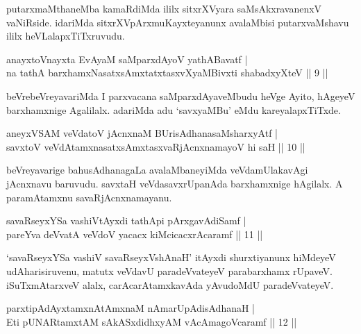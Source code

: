 \begin{artha}
putarxmaMthaneMba kamaRdiMda ililx sitxrXVyara saMsAkxravanenxV
vaNiRside. idariMda sitxrXVpArxmuKayxteyanunx avalaMbisi 
putarxvaMshavu ililx heVLalapxTiTxruvudu.
\end{artha}


\begin{shl}
anayxtoV\s nayxta EvAyaM saMparxdAyoV yathA\s Bavatf | \\
na tathA barxhamxNasatxsAmxtatxtasxvXyaMBivxti shabadxyXteV \hfill||  9 ||  
\end{shl}

\begin{artha}
beVrebeVreyavariMda I parxvacana saMparxdAyaveMbudu heVge Ayito, 
hAgeyeV barxhamxnige Agalilalx. adariMda adu `savxyaMBu' eMdu 
kareyalapxTiTxde.
\end{artha}

\begin{shl}
aneyxVSAM veVdatoV jAcnxnaM BUrisAdhanasaMsharxyAtf | \\
savxtoV veVdAtamxnasatxsAmxtasxvaRjAcnxnamayoV hi saH \hfill||  10 ||  
\end{shl}

\begin{artha}
beVreyavarige bahusAdhanagaLa avalaMbaneyiMda veVdamUlakavAgi 
jAcnxnavu baruvudu. savxtaH veVdasavxrUpanAda barxhamxnige hAgilalx. 
A paramAtamxnu savaRjAcnxnamayanu.
\end{artha}

	
\begin{shl}
savaRseyxYSa vashiVtAyxdi tathA\s pi pArxgavAdiSamf | \\
pareYva deVvatA veVdoV yacacx kiMcicacxrAcaramf \hfill||  11 ||  
\end{shl}
	
\begin{artha}
`savaRseyxYSa vashiV savaRseyxVshAnaH' itAyxdi shurxtiyanunx hiMdeyeV
udAharisiruvenu, matutx veVdavU paradeVvateyeV parabarxhamx rUpaveV. 
iSuTxmAtarxveV alalx, carAcarAtamxkavAda yAvudoMdU paradeVvateyeV.
\end{artha}


\begin{shl}
parxtipAdAyx\s \s tamxnA\s \s tAmxnaM nAmarUpAdisAdhanaH | \\
Eti pUNARtamxtAM sAkASxdidhxyAM vAcAmagoVcaramf \hfill||  12 ||  
\end{shl}

